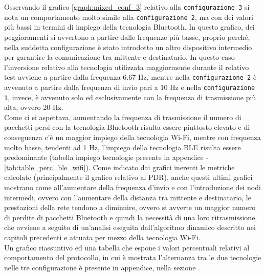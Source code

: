 \noindent Osservando il grafico \ref{graph:mixed_conf_3} relativo alla \texttt{configurazione 3} si nota un comportamento molto simile alla \texttt{configurazione 2}, ma con dei valori più bassi in termini di impiego della tecnologia Bluetooth. In questo grafico, dei peggioramenti si avvertono a partire dalle frequenze più basse, proprio perché, nella suddetta configurazione è stato introdotto un altro dispositivo intermedio per garantire la comunicazione tra mittente e destinatario. In questo caso l'inversione relativo alla tecnologia utilizzata maggiormente durante il relativo test avviene a partire dalla frequenza 6.67 Hz, mentre nella \texttt{configurazione 2} è avvenuto a partire dalla frequenza di invio pari a 10 Hz e nella \texttt{configurazione 1}, invece, è avvenuto solo ed esclusivamente con la frequenza di trasmissione più alta, ovvero 20 Hz.\\

\noindent Come ci si aspettava, aumentando la frequenza di trasmissione il numero di pacchetti persi con la tecnologia Bluetooth risulta essere piuttosto elevato e di conseguenza c'è un maggior impiego della tecnologia Wi-Fi, mentre con frequenza molto basse, tendenti ad 1 Hz, l'impiego della tecnologia BLE risulta essere predominante (tabella impiego tecnologie presente in appendice - \ref{tab:table_perc_ble_wifi}).
Come indicato dai grafici inerenti le metriche calcolate (principalmente il grafico relativo al PDR), anche questi ultimi grafici mostrano come all'aumentare della frequenza d'invio e con l'introduzione dei nodi intermedi, ovvero con l'aumentare della distanza tra mittente e destinatario, le prestazioni della rete tendono a diminuire, ovvero si avverte un maggior numero di perdite di pacchetti Bluetooth e quindi la necessità di una loro ritrasmissione, che avviene a seguito di un'analisi eseguita dall'algoritmo dinamico descritto nei capitoli precedenti e attuata per mezzo della tecnologia Wi-Fi.\\

\noindent Un grafico riassuntivo ed una tabella che espone i valori percentuali relativi al comportamento del protocollo, in cui è mostrata l'alternanza tra le due tecnologie nelle tre configurazione è presente in appendice, nella sezione \textit{}.
